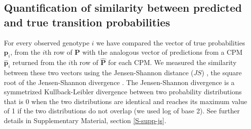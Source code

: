 \documentclass[a4paper,10pt]{article}
\newcommand{\idea}[1]{\textcolor{red}{#1}}
\begin{document}






\subsection{Quantification of similarity between predicted and true
  transition probabilities} \label{sec:js}

For every observed genotype $i$ we have compared the vector of true
probabilities $\mathbf{p}_i$, from the $i$th row of $\mathbf{P}$ with the
analogous vector of predictions from a CPM $\mathbf{\hat{p}}_i$ returned
from the $i$th row of $\mathbf{\hat{P}}$ for each CPM. We measured the
similarity between these two vectors using the Jensen-Shannon distance
($JS$) \cite{crooks2017}, the square root of the Jensen-Shannon divergence
\cite{lin1991}. The Jensen-Shannon divergence is a symmetrized
Kullback-Leibler divergence between two probability distributions that is
0 when the two distributions are identical and reaches its maximum value
of 1 if the two distributions do not overlap (we used log of base 2). See
further details in Supplementary Material, section \ref{S-supp-js}.
\end{document}

